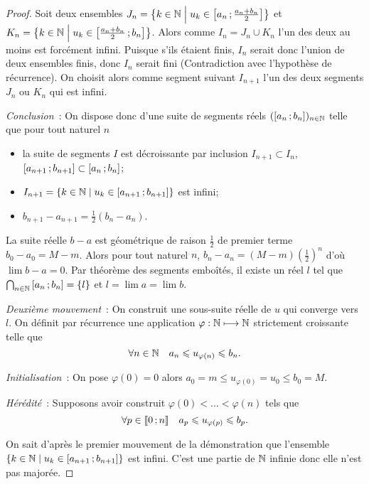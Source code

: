 \begin{proof}
Soit deux ensembles \(J_n = \left\{k \in \mathbb{N}\mathrel{}\middle|\mathrel{}u_k \in \left[ a_n \, ;  \frac{a_n+b_n}{2} \right]\right\}\) et \(K_n = \left\{k \in \mathbb{N}\mathrel{}\middle|\mathrel{}u_k \in \left[ \frac{a_n+b_n}{2} \, ;  b_n \right]\right\}\). Alors comme \(I_n = J_n \cup K_n\) l'un des deux au moins est forcément infini. Puisque s'ils étaient finis, \(I_n\) serait donc l'union de deux ensembles finis, donc \(I_n\) serait fini (Contradiction avec l'hypothèse de récurrence). On choisit alors comme segment suivant \(I_{n+1}\) l'un des deux segments \(J_n\) ou \(K_n\) qui est infini.

\emph{Conclusion}~: On dispose donc d'une suite de segments réels \((\left[ a_n \, ;  b_n \right])_{n \in \mathbb{N}}\) telle que pour tout naturel \(n\)
\begin{itemize}
    \item la suite de segments \(I\) est décroissante par inclusion \(I_{n+1} \subset I_n\), \(\left[ a_{n+1} \, ;  b_{n+1} \right] \subset \left[ a_{n} \, ;  b_{n} \right]\);
    \item \(I_{n+1} = \left\{k \in \mathbb{N}\mathrel{}\middle|\mathrel{}u_k \in \left[ a_{n+1} \, ;  b_{n+1} \right]\right\}\) est infini;
    \item \(b_{n+1}-a_{n+1}=\frac{1}{2}(b_n-a_n)\).
\end{itemize}

La suite réelle \(b-a\) est géométrique de raison \(\frac{1}{2}\) de premier terme \(b_0-a_0=M-m\). Alors pour tout naturel \(n\), \(b_n-a_n=(M-m) \left(\frac{1}{2}\right)^n\) d'où \(\lim b-a=0\). Par théorème des segments emboîtés, il existe un réel \(l\) tel que \(\bigcap_{n \in \mathbb{N}} \left[ a_{n} \, ;  b_{n} \right]=\{l\}\) et \(l=\lim a = \lim b\).


\emph{Deuxième mouvement}~: On construit une sous-suite réelle de \(u\) qui converge vers \(l\). On définit par récurrence une application \(\varphi : \mathbb{N} \longmapsto \mathbb{N}\) strictement croissante telle que
\begin{equation}
  \forall n \in \mathbb{N} \quad a_n \leqslant u_{\varphi(n)} \leqslant b_n.
\end{equation}

\emph{Initialisation}~: On pose \(\varphi(0)=0\) alors \(a_0=m \leqslant u_{\varphi(0)}=u_{0} \leqslant b_0=M\).

\emph{Hérédité}~: Supposons avoir construit \(\varphi(0) < \ldots < \varphi(n)\) tels que
\begin{equation}
  \forall p \in \mathopen{\llbracket}0\mathclose{}\mathpunct{};n\mathclose{\rrbracket} \quad a_p \leqslant u_{\varphi(p)} \leqslant b_p.
\end{equation}

On sait d'après le premier mouvement de la démonstration que l'ensemble \(\left\{k \in \mathbb{N}\mathrel{}\middle|\mathrel{}u_k \in \left[ a_{n+1} \, ;  b_{n+1} \right]\right\}\) est infini. C'est une partie de \(\mathbb{N}\) infinie donc elle n'est pas majorée.


\end{proof}
